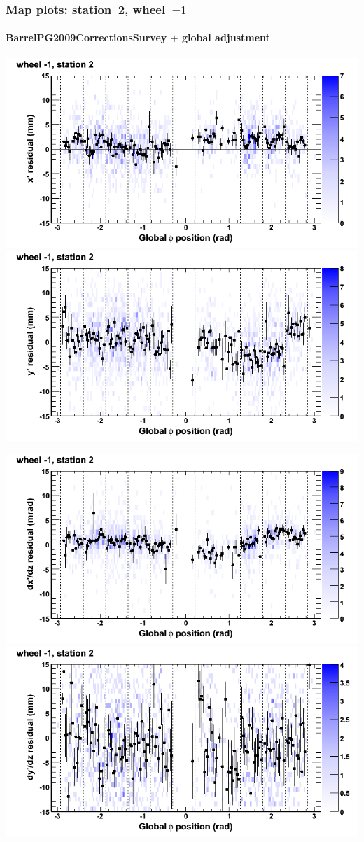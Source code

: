 \documentclass[compress]{beamer}
\begin{document}
\begin{frame}
\frametitle{Map plots: station~2, wheel~$-1$}
\framesubtitle{BarrelPG2009CorrectionsSurvey $+$ global adjustment}
\includegraphics[width=0.5\linewidth]{mapplots_re01/DTvsphi_st2whB_x.png}
\includegraphics[width=0.5\linewidth]{mapplots_re01/DTvsphi_st2whB_y.png}

\includegraphics[width=0.5\linewidth]{mapplots_re01/DTvsphi_st2whB_dxdz.png}
\includegraphics[width=0.5\linewidth]{mapplots_re01/DTvsphi_st2whB_dydz.png}
\end{frame}
\end{document}
